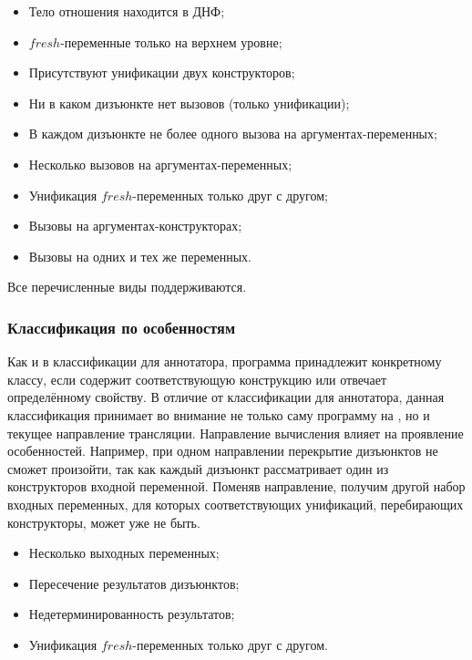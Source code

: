 \begin{itemize}
    \item Тело отношения находится в ДНФ;
    \item $fresh$-переменные только на верхнем уровне;
    \item Присутствуют унификации двух конструкторов;
    \item Ни в каком дизъюнкте нет вызовов (только унификации);
    \item В каждом дизъюнкте не более одного вызова на аргументах-переменных;
    \item Несколько вызовов на аргументах-переменных;
    \item Унификация $fresh$-переменных только друг с другом;
    \item Вызовы на аргументах-конструкторах;
    \item Вызовы на одних и тех же переменных.
\end{itemize}

Все перечисленные виды поддерживаются.


\subsubsection{Классификация по особенностям \miniKanren{}}

Как и в классификации для аннотатора, программа принадлежит конкретному классу, если содержит соответствующую конструкцию или отвечает определённому свойству.
В отличие от классификации для аннотатора, данная классификация принимает во внимание не только саму программу на \miniKanren{}, но и текущее направление трансляции.
Направление вычисления влияет на проявление особенностей.
Например, при одном направлении перекрытие дизъюнктов не сможет произойти, так как каждый дизъюнкт рассматривает один из конструкторов входной переменной.
Поменяв направление, получим другой набор входных переменных, для которых соответствующих унификаций, перебирающих конструкторы, может уже не быть.

\begin{itemize}
    \item Несколько выходных переменных;
    \item Пересечение результатов дизъюнктов;
    \item Недетерминированность результатов;
    \item Унификация $fresh$-переменных только друг с другом.
\end{itemize}

